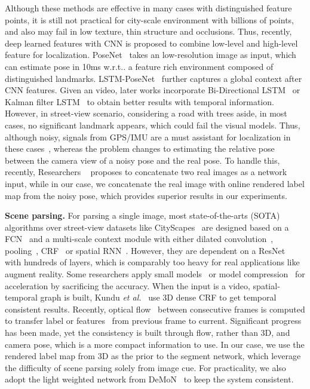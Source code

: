 \documentclass[10pt,twocolumn,letterpaper]{article}
\makeatletter
\DeclareRobustCommand\onedot{\futurelet\@let@token\@onedot}
\def\onedot{\ifx\@let@token.\else.\null\fi\xspace}
\def\wrt{w.r.t\onedot}
\def\etal{\emph{et al.}}
\makeatother
\begin{document}
Although these methods are effective in many cases with distinguished feature points, it is still not practical for city-scale environment with billions of points, and also may fail in low texture, thin structure and occlusions. 
Thus, recently, deep learned features with CNN is proposed to combine low-level and high-level feature for localization. PoseNet~\cite{Kendall_2015_ICCV,kendall2017geometric} takes an low-resolution image as input, which can estimate pose in 10ms \wrt a feature rich environment composed of distinguished landmarks. LSTM-PoseNet~\cite{hazirbasimage} further captures a global context after CNN features.
Given an video, later works incorporate Bi-Directional LSTM~\cite{DBLP:journals/corr/ClarkWMTW17} or Kalman filter LSTM~\cite{coskun2017long} to obtain better results with temporal information. However, in street-view scenario, considering a road with trees aside, in most cases, no significant landmark appears, which could fail the visual models. Thus, although noisy, signals from GPS/IMU are a must assistant for localization in these cases~\cite{vishal2015accurate}, whereas the problem changes to estimating the relative pose between the camera view of a noisy pose and the real pose. To handle this, recently, Researchers ~\cite{laskar2017camera,ummenhofer2016demon} proposes to concatenate two real images as a network input, while in our case, we concatenate the real image with online rendered label map from the noisy pose, which provides superior results in our experiments.

\textbf{Scene parsing.} For parsing a single image, most state-of-the-arts (SOTA) algorithms over street-view datasets like CityScapes~\cite{Cordts2016Cityscapes} are designed based on a FCN~\cite{WuSH16e} and a multi-scale context module with either dilated convolution~\cite{ChenPSA17}, pooling~\cite{ZhaoSQWJ16}, CRF~\cite{} or spatial RNN~\cite{byeon2015scene}. However, they are dependent on a ResNet~\cite{HeZRS15} with hundreds of layers, which is comparably too heavy for real applications like augment reality. Some researchers apply small models~\cite{PaszkeCKC16} or model compression~\cite{ZhaoQSSJ17} for acceleration by sacrificing the accuracy. 
When the input is a video, spatial-temporal graph is built, Kundu \etal~\cite{kundu2016feature} use 3D dense CRF to get temporal consistent results. Recently, optical flow~\cite{dosovitskiy2015flownet} between consecutive frames is computed to transfer label or features~\cite{gadde2017semantic,zhu2016deep} from previous frame to current.  Significant progress has been made, yet the consistency is built through flow, rather than 3D, and camera pose, which is a more compact information to use. In our case, we use the rendered label map from 3D as the prior to the segment network, which leverage the difficulty of scene parsing solely from image cue. For practicality, we also adopt the light weighted network from DeMoN~\cite{ummenhofer2016demon} to keep the system consistent.
\end{document}
